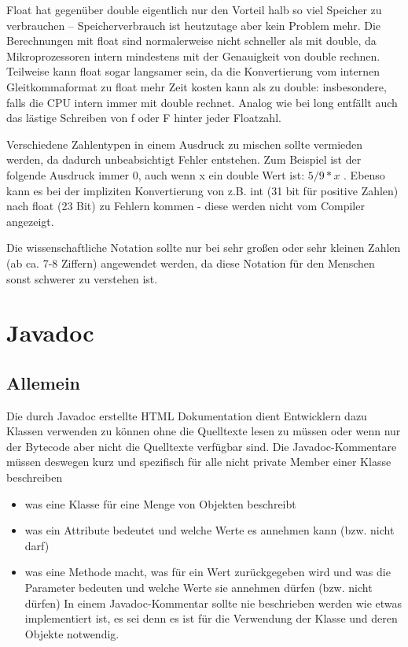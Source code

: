 Float hat gegenüber double eigentlich nur den Vorteil halb so viel Speicher zu verbrauchen – Speicherverbrauch ist heutzutage aber kein Problem mehr. Die Berechnungen mit float sind normalerweise nicht schneller als mit double, da Mikroprozessoren intern mindestens mit der Genauigkeit von double rechnen. Teilweise kann float sogar langsamer sein, da die Konvertierung vom internen Gleitkommaformat zu float mehr Zeit kosten kann als zu double: insbesondere, falls die CPU intern immer mit double rechnet. Analog wie bei long entfällt auch das lästige Schreiben von f oder F hinter jeder Floatzahl.

Verschiedene Zahlentypen in einem Ausdruck zu mischen sollte vermieden werden, da dadurch unbeabsichtigt Fehler entstehen. Zum Beispiel ist der folgende Ausdruck immer 0, auch wenn x ein double Wert ist: $5 / 9 * x$ . Ebenso kann es bei der impliziten Konvertierung von z.B. int (31 bit für positive Zahlen) nach float (23 Bit) zu Fehlern kommen - diese werden nicht vom Compiler angezeigt.

Die wissenschaftliche Notation sollte nur bei sehr großen oder sehr kleinen Zahlen (ab ca. 7-8 Ziffern) angewendet werden, da diese Notation für den Menschen sonst schwerer zu verstehen ist.

\section{Javadoc}

\subsection{Allemein}

Die durch Javadoc erstellte HTML Dokumentation dient Entwicklern dazu Klassen verwenden zu können ohne die Quelltexte lesen zu müssen oder wenn nur der Bytecode aber nicht die Quelltexte verfügbar sind. Die Javadoc-Kommentare müssen deswegen kurz und spezifisch für alle nicht private Member einer Klasse beschreiben

\begin{itemize}
\item was eine Klasse für eine Menge von Objekten beschreibt
\item was ein Attribute bedeutet und welche Werte es annehmen kann (bzw. nicht darf)
\item was eine Methode macht, was für ein Wert zurückgegeben wird und was die Parameter bedeuten und welche Werte sie annehmen dürfen (bzw. nicht dürfen)
In einem Javadoc-Kommentar sollte nie beschrieben werden wie etwas implementiert ist, es sei denn es ist für die Verwendung der Klasse und deren Objekte notwendig.
\end{itemize}


